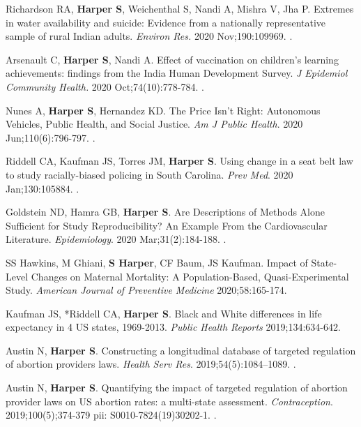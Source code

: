 \documentclass[
  letterpaper,
  DIV=11,
  numbers=noendperiod]{scrartcl}
\begin{document}
\begin{etaremune}
\item *Richardson RA, \textbf{Harper S}, Weichenthal S, Nandi A, Mishra V, Jha P. Extremes in water availability and suicide: Evidence from a nationally representative sample of rural Indian adults. \emph{Environ Res.} 2020 Nov;190:109969. . 

\item *Arsenault C, \textbf{Harper S}, Nandi A. Effect of vaccination on children's learning achievements: findings from the India Human Development Survey. \emph{J Epidemiol Community Health.} 2020 Oct;74(10):778-784. . 

\item Nunes A, \textbf{Harper S}, Hernandez KD. The Price Isn't Right: Autonomous Vehicles, Public Health, and Social Justice. \emph{Am J Public Health}. 2020 Jun;110(6):796-797. .

\item *Riddell CA, Kaufman JS, Torres JM, \textbf{Harper S}. Using change in a seat belt law to study racially-biased policing in South Carolina. \emph{Prev Med}. 2020 Jan;130:105884. .

\item Goldstein ND, Hamra GB, \textbf{Harper S}. Are Descriptions of Methods Alone Sufficient for Study Reproducibility? An Example From the Cardiovascular Literature.
\emph{Epidemiology}. 2020 Mar;31(2):184-188. .

\item SS Hawkins, M Ghiani, \textbf{S Harper}, CF Baum, JS Kaufman. Impact of State-Level Changes on Maternal Mortality: A Population-Based, Quasi-Experimental Study. \emph{American Journal of Preventive Medicine} 2020;58:165-174.

\item Kaufman JS, *Riddell CA, \textbf{Harper S}. Black and White differences in life expectancy in 4 US states, 1969-2013. \emph{Public Health Reports} 2019;134:634-642.

\item *Austin N, \textbf{Harper S}. Constructing a longitudinal database of targeted regulation of abortion providers laws. \emph{Health Serv Res}. 2019;54(5):1084–1089. . 

\item *Austin N, \textbf{Harper S}. Quantifying the impact of targeted regulation of abortion provider laws on US abortion rates: a multi-state assessment. \emph{Contraception}. 2019;100(5);374-379 pii: S0010-7824(19)30202-1. . 


\end{etaremune}
\end{document}
